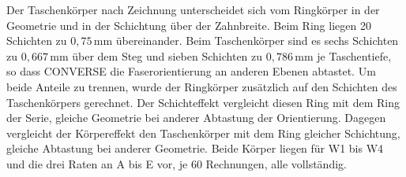 		Der Taschenkörper nach Zeichnung unterscheidet sich vom Ringkörper in der Geometrie und in der Schichtung über der Zahnbreite. Beim Ring liegen 20 Schichten zu $0{,}75$\,mm übereinander. Beim Taschenkörper sind es sechs Schichten zu $0{,}667$\,mm über dem Steg und sieben Schichten zu $0{,}786$\,mm je Taschentiefe, so dass CONVERSE die Faserorientierung an anderen Ebenen abtastet. Um beide Anteile zu trennen, wurde der Ringkörper zusätzlich auf den Schichten des Taschenkörpers gerechnet. Der Schichteffekt vergleicht diesen Ring mit dem Ring der Serie, gleiche Geometrie bei anderer Abtastung der Orientierung. Dagegen vergleicht der Körpereffekt den Taschenkörper mit dem Ring gleicher Schichtung, gleiche Abtastung bei anderer Geometrie. Beide Körper liegen für W1 bis W4 und die drei Raten an A bis E vor, je 60 Rechnungen, alle vollständig.

